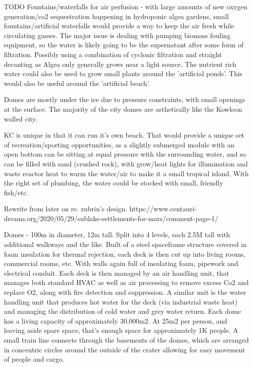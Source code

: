 \documentclass[10pt]{article}
\begin{document}
TODO Fountains/waterfalls for air perfusion - with large amounts of new oxygen generation/co2 sequestration happening in hydroponic algea gardens, small fountains/artificial waterfalls would provide a way to keep the air fresh while circulating gasses. The major issue is dealing with pumping biomass fouling equipment, so the water is likely going to be the supernatant after some form of filtration. Possibly using a combination of cyclonic filtration and straight decanting as Algea only generally grows near a light source. The nutrient rich water could also be used to grow small plants around the 'artificial ponds'. This would also be useful around the 'artificial beach'.

Domes are mostly under the ice due to pressure constraints, with small openings at the surface. The majority of the city domes are asthetically like the Kowloon walled city.

 KC is unique in that it can run it's own beach. That would provide a unique set of recreation/sporting opportunities, as a slightly submerged module with an open bottom can be sitting at equal pressure with the surrounding water, and so can be filled with sand (crushed rock), with grow/heat lights for illumination and waste reactor heat to warm the water/air to make it a small tropical island. With the right set of plumbing, the water could be stocked with small, friendly fish/etc.
 
 Rewrite from later on re. zubrin's design.
https://www.centauri-dreams.org/2020/05/29/sublake-settlements-for-mars/comment-page-1/

Domes - 100m in diameter, 12m tall. Split into 4 levels, each 2.5M tall with additional walkways and the like. Built of a steel spaceframe structure covered in foam insulation for thermal rejection, each deck is then cut up into living rooms, commercial rooms, etc. With walls again full of insulating foam, pipework and electrical conduit. Each deck is then managed by an air handling unit, that manages both standard HVAC as well as air processing to remove excess Co2 and replace O2, along with fire detection and suppression. A similar unit is the water handling unit that produces hot water for the deck (via industrial waste heat) and managing the distribution of cold water and grey water return. Each dome has a living capacity of approximately 30,000m2. At 25m2 per person, and leaving aside spare space, that's enough space for approximately 1K people. A small train line connects through the basements of the domes, which are arranged in concentric circles around the outside of the crater allowing for easy movement of people and cargo.
\end{document}
